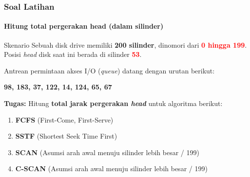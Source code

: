 \documentclass[t,aspectratio=169,xcolor=dvipsnames]{beamer}
\newcommand{\tem}[1]{\textbf{\textcolor{red}{#1}}}
\begin{document}
\begin{frame}
    \frametitle{Soal Latihan}
    \framesubtitle{Hitung total pergerakan head (dalam silinder)}
    \small
    \begin{block}{Skenario}
        Sebuah disk drive memiliki \textbf{200 silinder}, dinomori dari \tem{0 hingga 199}.\\
        Posisi \textit{head} disk saat ini berada di silinder \tem{53}.
    \end{block}
    
    Antrean permintaan akses I/O (\textit{queue}) datang dengan urutan berikut:
    \begin{center}
        \Large \textbf{98, 183, 37, 122, 14, 124, 65, 67}
    \end{center}
    
    \vspace{0.3cm}
    \textbf{Tugas:}
    Hitung \textbf{total jarak pergerakan \textit{head}} untuk algoritma berikut:
    \begin{enumerate}
        \item \textbf{FCFS} (First-Come, First-Serve)
        \item \textbf{SSTF} (Shortest Seek Time First)
        \item \textbf{SCAN} (Asumsi arah awal menuju silinder lebih besar / 199)
        \item \textbf{C-SCAN} (Asumsi arah awal menuju silinder lebih besar / 199)
    \end{enumerate}
\end{frame}
\end{document}
